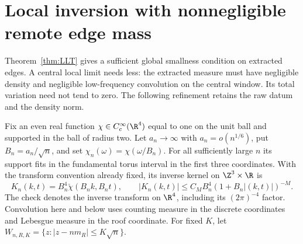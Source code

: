 \section{Local inversion with nonnegligible remote edge mass}
\label{sec:localized-inversion}
Theorem~\ref{thm:LLT} gives a sufficient global smallness condition on
extracted edges. A central local limit needs less: the extracted measure
must have negligible density and negligible low-frequency convolution
on the central window. Its total variation need not tend to zero.
The following refinement retains the raw datum and the density norm.

Fix an even real function $\chi\in C_c^\infty(\R^4)$ equal to one on
the unit ball and supported in the ball of radius two. Let $a_n\to\infty$
with $a_n=o(n^{1/6})$, put $B_n=a_n/\sqrt n$, and set
$\chi_n(\omega)=\chi(\omega/B_n)$. For all sufficiently large $n$ its
support fits in the fundamental torus interval in the first three
coordinates. With the transform convention already fixed, its inverse
kernel on $\Z^3\times\R$ is
\begin{equation}\label{eq:localized-kernel}
 K_n(k,t)=B_n^4\check\chi(B_nk,B_nt),\qquad
 |K_n(k,t)|\le C_M B_n^4(1+B_n|(k,t)|)^{-M}.
\end{equation}
The check denotes the inverse transform on $\R^4$, including its
$(2\pi)^{-4}$ factor. Convolution here and below uses counting measure
in the discrete coordinates and Lebesgue measure in the roof coordinate.
For fixed $K$, let $W_{n,R,K}=\{z:|z-nm_R|\le K\sqrt n\}$.

